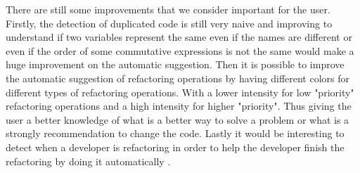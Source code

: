 There are still some improvements that we consider important for the user.
Firstly, the detection of duplicated code is still very naive and improving to understand if
two variables represent the same even if the names are different or even if the
 order of some commutative expressions is not the same would make a huge improvement
 on the automatic suggestion.
Then it is possible to improve the automatic suggestion of refactoring operations by
having different colors for different types of refactoring operations.
With a lower intensity for low "priority" refactoring operations and a high intensity
for higher "priority". Thus giving the user a better knowledge of what is a better
way to solve a problem or what is a strongly recommendation to change the code.
Lastly it would be interesting to detect when a developer is refactoring in order to help the developer finish the
refactoring by doing it automatically \cite{ge2012reconciling}.
